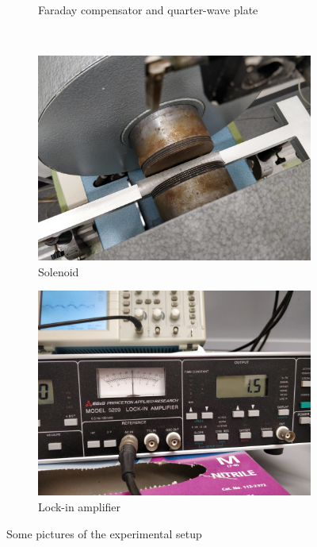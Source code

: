 \documentclass[11pt,a4paper]{article}
\begin{document}
\begin{figure}[H]
\begin{subfigure}[b]{0.45\textwidth}
\caption{Faraday compensator and quarter-wave plate}
\label{fig:exp_setup_faraday}
\end{subfigure}\\\vspace{.2cm}
\begin{subfigure}[b]{0.45\textwidth}
\includegraphics[width=\textwidth]{solenoid}
\caption{Solenoid}
\label{fig:exp_setup_solenoid}
\end{subfigure}
\begin{subfigure}[b]{0.45\textwidth}
\includegraphics[width=\textwidth]{lock-in}
\caption{Lock-in amplifier}
\label{fig:exp_setup_lockin}
\end{subfigure}
\caption{Some pictures of the experimental setup}\label{fig:exp_setup}
\end{figure}
	
\end{document}
